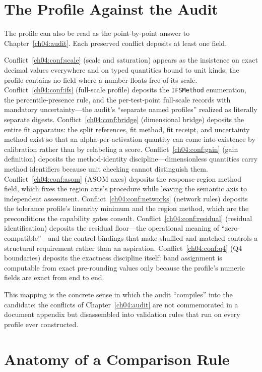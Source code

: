 \section{The Profile Against the Audit}\label{ch05:vsaudit}

The profile can also be read as the point-by-point answer to
Chapter~\ref{ch04:audit}. Each preserved conflict deposits at least one
field.

Conflict~\ref{ch04:conf:scale} (scale and saturation) appears as the
insistence on exact decimal values everywhere and on typed quantities bound
to unit kinds; the profile contains no field where a number floats free of
its scale. Conflict~\ref{ch04:conf:ifs} (full-scale profile) deposits the
\texttt{IFSMethod} enumeration, the percentile-presence rule, and the
per-test-point full-scale records with mandatory uncertainty---the audit's
``separate named profiles'' realized as literally separate digests.
Conflict~\ref{ch04:conf:bridge} (dimensional bridge) deposits the entire
fit apparatus: the split references, fit method, fit receipt, and
uncertainty method exist so that an alpha-per-activation quantity can come
into existence by calibration rather than by relabeling a score.
Conflict~\ref{ch04:conf:gain} (gain definition) deposits the method-identity
discipline---dimensionless quantities carry method identifiers because unit
checking cannot distinguish them. Conflict~\ref{ch04:conf:asom} (ASOM axes)
deposits the response-region method field, which fixes the region axis's
procedure while leaving the semantic axis to independent assessment.
Conflict~\ref{ch04:conf:networks} (network rules) deposits the tolerance
profile's linearity minimum and the region method, which are the
preconditions the capability gates consult.
Conflict~\ref{ch04:conf:residual} (residual identification) deposits the
residual floor---the operational meaning of ``zero-compatible''---and the
control bindings that make shuffled and matched controls a structural
requirement rather than an aspiration. Conflict~\ref{ch04:conf:q4} (Q4
boundaries) deposits the exactness discipline itself: band assignment is
computable from exact pre-rounding values only because the profile's
numeric fields are exact from end to end.

This mapping is the concrete sense in which the audit ``compiles'' into the
candidate: the conflicts of Chapter~\ref{ch04:audit} are not commemorated in
a document appendix but disassembled into validation rules that run on
every profile ever constructed.

\section{Anatomy of a Comparison Rule}\label{ch05:comparison}

